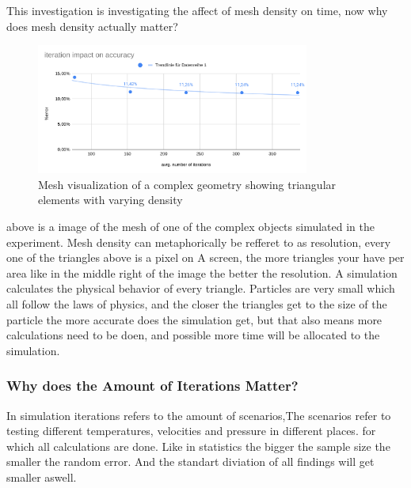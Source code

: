 \documentclass[12pt,a4paper]{article}
\begin{document}
This investigation is investigating the affect of mesh density on time, now why does mesh density actually matter?

\begin{figure}[H]
    \centering
    \includegraphics[width=0.8\textwidth]{image9.png}
    \caption{Mesh visualization of a complex geometry showing triangular elements with varying density}
    \label{fig:mesh_example}
\end{figure}

above is a image of the mesh of one of the complex objects simulated in the experiment. Mesh density can metaphorically be refferet to as resolution, every one of the triangles above is a pixel on A screen, the more triangles your have per area like in the middle right of the image the better the resolution. A simulation calculates the physical behavior of every triangle. Particles are very small which all follow the laws of physics, and the closer the triangles get to the size of the particle the more accurate does the simulation get, but that also means more calculations need to be doen, and possible more time will be allocated to the simulation.

\subsubsection{Why does the Amount of Iterations Matter?}

In simulation iterations refers to the amount of scenarios,The scenarios refer to testing different temperatures, velocities and pressure in different places. for which all calculations are done. Like in statistics the bigger the sample size the smaller the random error. And the standart diviation of all findings will get smaller aswell. 
\end{document}
